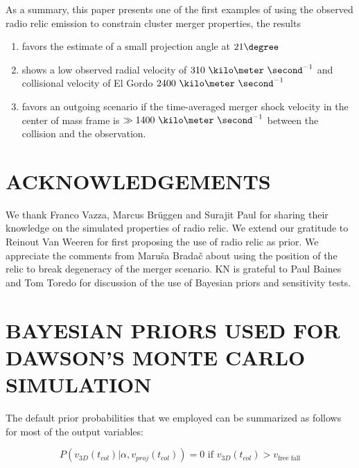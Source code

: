 As a summary, this paper presents one of the first examples of using the
observed radio relic emission to constrain cluster merger properties, the
results
\begin{enumerate}
\item favors the estimate of a small projection angle at $21 \degree$ \\ 
\item shows a low observed radial velocity of
	$310~\kilo\meter~\second^{-1}$ and collisional velocity of El
	Gordo $2400~\kilo\meter~\second^{-1}$ \\ 
\item favors an outgoing scenario if the time-averaged merger shock
	velocity in the center of mass frame is $\gg 1400~\kilo
	\meter~\second^{-1}$ between the collision and the observation. 
\end{enumerate}

\section{ACKNOWLEDGEMENTS}
We thank Franco Vazza, Marcus Br\"{u}ggen and Surajit Paul for sharing
their knowledge on the simulated properties of radio relic. We
extend our gratitude to Reinout Van Weeren for first proposing the use of
radio relic as prior. We appreciate the comments from Maru\v{s}a
Brada\v{c} about using the position of the relic to break degeneracy
of the merger scenario. KN is grateful to Paul Baines and Tom Toredo for
discussion of the use of Bayesian priors and sensitivity tests. 





\appendix

\section{BAYESIAN PRIORS USED FOR DAWSON'S MONTE CARLO SIMULATION}
\label{app:priors}
%
The default prior probabilities that we employed can be summarized as
follows for most of the output variables: 

\begin{equation}
	P(v_{3D}(t_{col}) | \alpha, v_{proj}(t_{col})) = 0\text{ if }v_{3D}(t_{col}) >
	v_{\text{free fall}} 
\end{equation}


